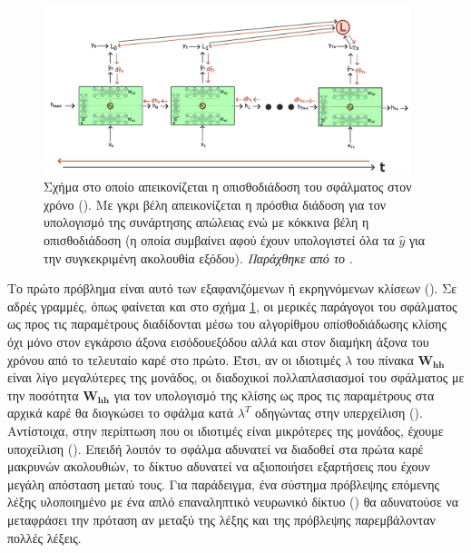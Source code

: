 \begin{figure}[h]
  \centering
  \includegraphics[width=0.95\textwidth]{images/chapter theoritical background/rnn_unroled_BPTT.pdf}
  \caption{Σχήμα στο οποίο απεικονίζεται η οπισθοδιάδοση του σφάλματος στον χρόνο (). Με γκρι βέλη απεικονίζεται η πρόσθια διάδοση για τον υπολογισμό της συνάρτησης απώλειας ενώ με κόκκινα βέλη η οπισθοδιάδοση (η οποία συμβαίνει αφού έχουν υπολογιστεί όλα τα $\hat{y}$ για την συγκεκριμένη ακολουθία εξόδου). \textit{Παράχθηκε από το \href{https://inkscape.org/}{}}.}
  \label{fig:rnn_bptt}
\end{figure}

Το πρώτο πρόβλημα είναι αυτό των εξαφανιζόμενων ή εκρηγνόμενων κλίσεων (). Σε αδρές γραμμές, όπως φαίνεται και στο σχήμα \ref{fig:rnn_bptt}, οι μερικές παράγογοι του σφάλματος ως προς τις παραμέτρους διαδίδονται μέσω του αλγορίθμου οπίσθοδιάδωσης κλίσης όχι μόνο στον εγκάρσιο άξονα εισόδου\textemdash εξόδου αλλά και στον διαμήκη άξονα του χρόνου από το τελευταίο καρέ στο πρώτο. Έτσι, αν οι ιδιοτιμές $\lambda$ του πίνακα $\boldsymbol{W_{hh}}$ είναι λίγο μεγαλύτερες της μονάδος, οι διαδοχικοί πολλαπλασιασμοί του σφάλματος με την ποσότητα $\boldsymbol{W_{hh}}$ για τον υπολογισμό της κλίσης ως προς τις παραμέτρους στα αρχικά καρέ θα διογκώσει το σφάλμα κατά ${\lambda}^{T}$ οδηγώντας στην υπερχείλιση (). Αντίστοιχα, στην περίπτωση που οι ιδιοτιμές είναι μικρότερες της μονάδος, έχουμε υποχείλιση (). Επειδή λοιπόν το σφάλμα αδυνατεί να διαδοθεί στα πρώτα καρέ μακρυνών ακολουθιών, το δίκτυο αδυνατεί να αξιοποιήσει εξαρτήσεις που έχουν μεγάλη απόσταση μεταύ τους. Για παράδειγμα, ένα σύστημα πρόβλεψης επόμενης λέξης υλοποιημένο με ένα απλό επαναληπτικό νευρωνικό δίκτυο () θα αδυνατούσε να μεταφράσει την πρόταση  αν μεταξύ της λέξης  και της πρόβλεψης παρεμβάλονταν πολλές λέξεις. \par

